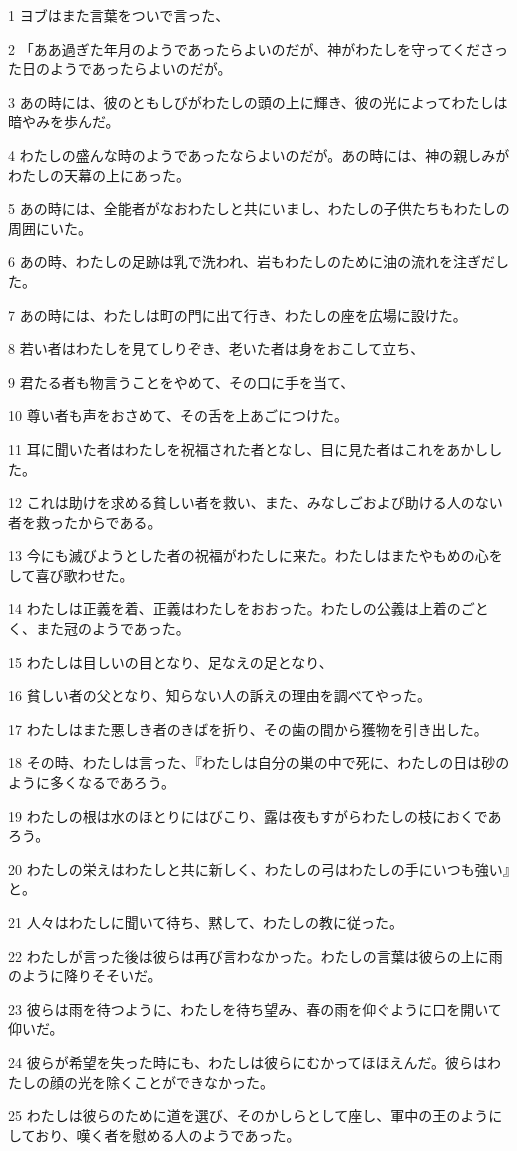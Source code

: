 \par 1 ヨブはまた言葉をついで言った、
\par 2 「ああ過ぎた年月のようであったらよいのだが、神がわたしを守ってくださった日のようであったらよいのだが。
\par 3 あの時には、彼のともしびがわたしの頭の上に輝き、彼の光によってわたしは暗やみを歩んだ。
\par 4 わたしの盛んな時のようであったならよいのだが。あの時には、神の親しみがわたしの天幕の上にあった。
\par 5 あの時には、全能者がなおわたしと共にいまし、わたしの子供たちもわたしの周囲にいた。
\par 6 あの時、わたしの足跡は乳で洗われ、岩もわたしのために油の流れを注ぎだした。
\par 7 あの時には、わたしは町の門に出て行き、わたしの座を広場に設けた。
\par 8 若い者はわたしを見てしりぞき、老いた者は身をおこして立ち、
\par 9 君たる者も物言うことをやめて、その口に手を当て、
\par 10 尊い者も声をおさめて、その舌を上あごにつけた。
\par 11 耳に聞いた者はわたしを祝福された者となし、目に見た者はこれをあかしした。
\par 12 これは助けを求める貧しい者を救い、また、みなしごおよび助ける人のない者を救ったからである。
\par 13 今にも滅びようとした者の祝福がわたしに来た。わたしはまたやもめの心をして喜び歌わせた。
\par 14 わたしは正義を着、正義はわたしをおおった。わたしの公義は上着のごとく、また冠のようであった。
\par 15 わたしは目しいの目となり、足なえの足となり、
\par 16 貧しい者の父となり、知らない人の訴えの理由を調べてやった。
\par 17 わたしはまた悪しき者のきばを折り、その歯の間から獲物を引き出した。
\par 18 その時、わたしは言った、『わたしは自分の巣の中で死に、わたしの日は砂のように多くなるであろう。
\par 19 わたしの根は水のほとりにはびこり、露は夜もすがらわたしの枝におくであろう。
\par 20 わたしの栄えはわたしと共に新しく、わたしの弓はわたしの手にいつも強い』と。
\par 21 人々はわたしに聞いて待ち、黙して、わたしの教に従った。
\par 22 わたしが言った後は彼らは再び言わなかった。わたしの言葉は彼らの上に雨のように降りそそいだ。
\par 23 彼らは雨を待つように、わたしを待ち望み、春の雨を仰ぐように口を開いて仰いだ。
\par 24 彼らが希望を失った時にも、わたしは彼らにむかってほほえんだ。彼らはわたしの顔の光を除くことができなかった。
\par 25 わたしは彼らのために道を選び、そのかしらとして座し、軍中の王のようにしており、嘆く者を慰める人のようであった。

